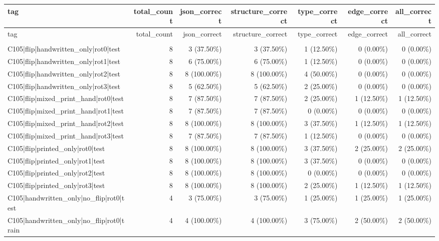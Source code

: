 \begin{longtable}{>{\raggedright\arraybackslash}p{5cm}rrrrrr}
\toprule
tag & total\_count & json\_correct & structure\_correct & type\_correct & edge\_correct & all\_correct \\
\midrule
\endfirsthead
\toprule
tag & total\_count & json\_correct & structure\_correct & type\_correct & edge\_correct & all\_correct \\
\midrule
\endhead
\midrule
\multicolumn{7}{r}{Continued on next page} \\
\midrule
\endfoot
\bottomrule
\endlastfoot
C105|flip|handwritten\_only|rot0|test & 8 & 3 (37.50\%) & 3 (37.50\%) & 1 (12.50\%) & 0 (0.00\%) & 0 (0.00\%) \\
C105|flip|handwritten\_only|rot1|test & 8 & 6 (75.00\%) & 6 (75.00\%) & 1 (12.50\%) & 0 (0.00\%) & 0 (0.00\%) \\
C105|flip|handwritten\_only|rot2|test & 8 & 8 (100.00\%) & 8 (100.00\%) & 4 (50.00\%) & 0 (0.00\%) & 0 (0.00\%) \\
C105|flip|handwritten\_only|rot3|test & 8 & 5 (62.50\%) & 5 (62.50\%) & 2 (25.00\%) & 0 (0.00\%) & 0 (0.00\%) \\
C105|flip|mixed\_print\_hand|rot0|test & 8 & 7 (87.50\%) & 7 (87.50\%) & 2 (25.00\%) & 1 (12.50\%) & 1 (12.50\%) \\
C105|flip|mixed\_print\_hand|rot1|test & 8 & 7 (87.50\%) & 7 (87.50\%) & 0 (0.00\%) & 0 (0.00\%) & 0 (0.00\%) \\
C105|flip|mixed\_print\_hand|rot2|test & 8 & 8 (100.00\%) & 8 (100.00\%) & 3 (37.50\%) & 1 (12.50\%) & 1 (12.50\%) \\
C105|flip|mixed\_print\_hand|rot3|test & 8 & 7 (87.50\%) & 7 (87.50\%) & 1 (12.50\%) & 0 (0.00\%) & 0 (0.00\%) \\
C105|flip|printed\_only|rot0|test & 8 & 8 (100.00\%) & 8 (100.00\%) & 3 (37.50\%) & 2 (25.00\%) & 2 (25.00\%) \\
C105|flip|printed\_only|rot1|test & 8 & 8 (100.00\%) & 8 (100.00\%) & 3 (37.50\%) & 0 (0.00\%) & 0 (0.00\%) \\
C105|flip|printed\_only|rot2|test & 8 & 8 (100.00\%) & 8 (100.00\%) & 0 (0.00\%) & 0 (0.00\%) & 0 (0.00\%) \\
C105|flip|printed\_only|rot3|test & 8 & 8 (100.00\%) & 8 (100.00\%) & 2 (25.00\%) & 1 (12.50\%) & 1 (12.50\%) \\
C105|handwritten\_only|no\_flip|rot0|test & 4 & 3 (75.00\%) & 3 (75.00\%) & 1 (25.00\%) & 1 (25.00\%) & 1 (25.00\%) \\
C105|handwritten\_only|no\_flip|rot0|train & 4 & 4 (100.00\%) & 4 (100.00\%) & 3 (75.00\%) & 2 (50.00\%) & 2 (50.00\%) \\

\end{longtable}
